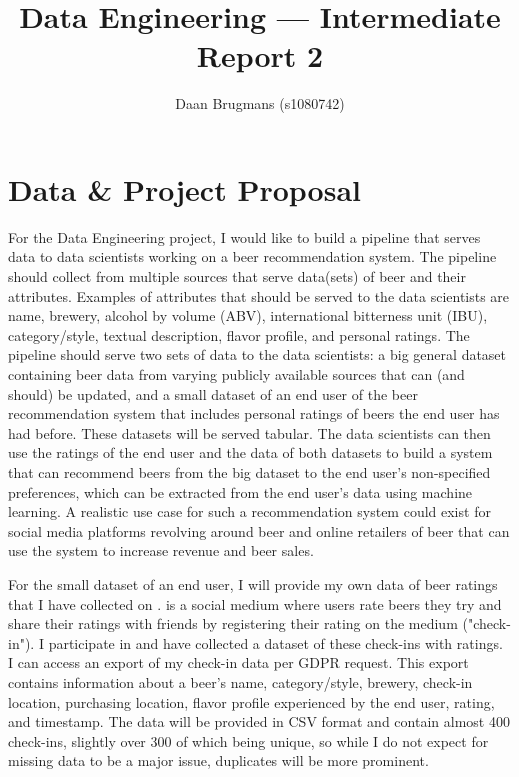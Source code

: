 \documentclass[sigconf, natbib=true]{acmart}
\begin{document}
\title{Data Engineering --- Intermediate Report 2}

\author{Daan Brugmans (s1080742)}

\maketitle

\section{Data \& Project Proposal}
For the Data Engineering project, I would like to build a pipeline that serves data to data scientists working on a beer recommendation system.
The pipeline should collect from multiple sources that serve data(sets) of beer and their attributes.
Examples of attributes that should be served to the data scientists are name, brewery, alcohol by volume (ABV), international bitterness unit (IBU), category/style, textual description, flavor profile, and personal ratings.
The pipeline should serve two sets of data to the data scientists: a big general dataset containing beer data from varying publicly available sources that can (and should) be updated, and a small dataset of an end user of the beer recommendation system that includes personal ratings of beers the end user has had before.
These datasets will be served tabular.
The data scientists can then use the ratings of the end user and the data of both datasets to build a system that can recommend beers from the big dataset to the end user's non-specified preferences, which can be extracted from the end user's data using machine learning.
A realistic use case for such a recommendation system could exist for social media platforms revolving around beer and online retailers of beer that can use the system to increase revenue and beer sales.

For the small dataset of an end user, I will provide my own data of beer ratings that I have collected on \citeauthor{untappd}.
\citet{untappd} is a social medium where users rate beers they try and share their ratings with friends by registering their rating on the medium ("check-in").
I participate in \citeauthor{untappd} and have collected a dataset of these check-ins with ratings.
I can access an export of my check-in data per GDPR request.
This export contains information about a beer's name, category/style, brewery, check-in location, purchasing location, flavor profile experienced by the end user, rating, and timestamp.
The data will be provided in CSV format and contain almost 400 check-ins, slightly over 300 of which being unique, so while I do not expect for missing data to be a major issue, duplicates will be more prominent.
\end{document}
